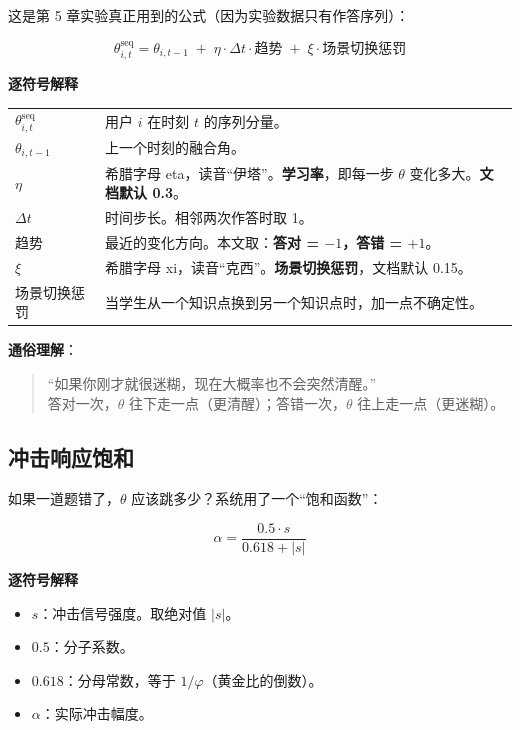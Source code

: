 \documentclass[UTF8,a4paper,11pt]{ctexart}
\newenvironment{explainbox}[1]
{\begin{center}\begin{minipage}{0.94\textwidth}\colorbox{boxbg}{\parbox{0.92\textwidth}{\textbf{#1}\par\vspace{2pt}}}}
{\end{minipage}\end{center}}
\newcommand{\hl}[1]{\textcolor{blue!70!black}{\textbf{#1}}}
\begin{document}
这是第 5 章实验真正用到的公式（因为实验数据只有作答序列）：

\begin{equation}
\theta^{\text{seq}}_{i,t} = \theta_{i,t-1} \;+\; \eta \cdot \Delta t \cdot \text{趋势} \;+\; \xi \cdot \text{场景切换惩罚}
\label{p1:eq:theta-seq}
\end{equation}

\begin{explainbox}{逐符号解释}
\begin{longtable}{@{}p{3.2cm}p{10.6cm}@{}}
$\theta^{\text{seq}}_{i,t}$ & 用户 $i$ 在时刻 $t$ 的序列分量。 \\
$\theta_{i,t-1}$ & 上一个时刻的融合角。 \\
$\eta$ & 希腊字母 eta，读音“伊塔”。\hl{学习率}，即每一步 $\theta$ 变化多大。\textbf{文档默认 0.3}。 \\
$\Delta t$ & 时间步长。相邻两次作答时取 1。 \\
趋势 & 最近的变化方向。本文取：\textbf{答对 = $-1$，答错 = $+1$}。 \\
$\xi$ & 希腊字母 xi，读音“克西”。\textbf{场景切换惩罚}，文档默认 0.15。 \\
场景切换惩罚 & 当学生从一个知识点换到另一个知识点时，加一点不确定性。 \\
\end{longtable}
\end{explainbox}

\textbf{通俗理解}：

\begin{quote}
“如果你刚才就很迷糊，现在大概率也不会突然清醒。”\\
答对一次，$\theta$ 往下走一点（更清醒）；答错一次，$\theta$ 往上走一点（更迷糊）。
\end{quote}

\subsection{冲击响应饱和}

如果一道题错了，$\theta$ 应该跳多少？系统用了一个“饱和函数”：

\begin{equation}
\alpha = \frac{0.5 \cdot s}{0.618 + |s|}
\label{p1:eq:saturation}
\end{equation}

\begin{explainbox}{逐符号解释}
\begin{itemize}[leftmargin=1.4em,itemsep=1pt]
\item $s$：冲击信号强度。取绝对值 $|s|$。
\item $0.5$：分子系数。
\item $0.618$：分母常数，等于 $1/\varphi$（黄金比的倒数）。
\item $\alpha$：实际冲击幅度。
\end{itemize}
\end{explainbox}
\end{document}

